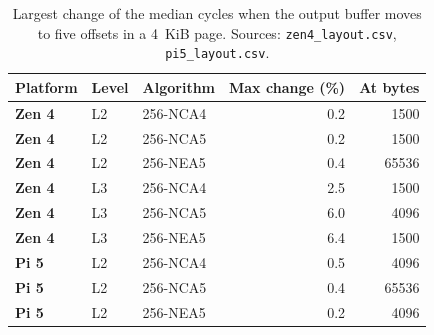 \begin{table}[!htbp]
\centering
\caption{Largest change of the median cycles when the output buffer moves to five offsets in a 4~KiB page. Sources: \texttt{zen4\_layout.csv}, \texttt{pi5\_layout.csv}.}
\label{tab:s-layout}
\footnotesize
\begin{tabular}{@{}>{\bfseries}l l l r r@{}}
\toprule
\textbf{Platform} & \textbf{Level} & \textbf{Algorithm} & \textbf{Max change (\%)} & \textbf{At bytes} \\
\midrule
Zen 4 & L2 & 256-NCA4 & 0.2 & 1500 \\
Zen 4 & L2 & 256-NCA5 & 0.2 & 1500 \\
Zen 4 & L2 & 256-NEA5 & 0.4 & 65536 \\
Zen 4 & L3 & 256-NCA4 & 2.5 & 1500 \\
Zen 4 & L3 & 256-NCA5 & 6.0 & 4096 \\
Zen 4 & L3 & 256-NEA5 & 6.4 & 1500 \\
Pi 5 & L2 & 256-NCA4 & 0.5 & 4096 \\
Pi 5 & L2 & 256-NCA5 & 0.4 & 65536 \\
Pi 5 & L2 & 256-NEA5 & 0.2 & 4096 \\
\bottomrule
\end{tabular}
\end{table}
